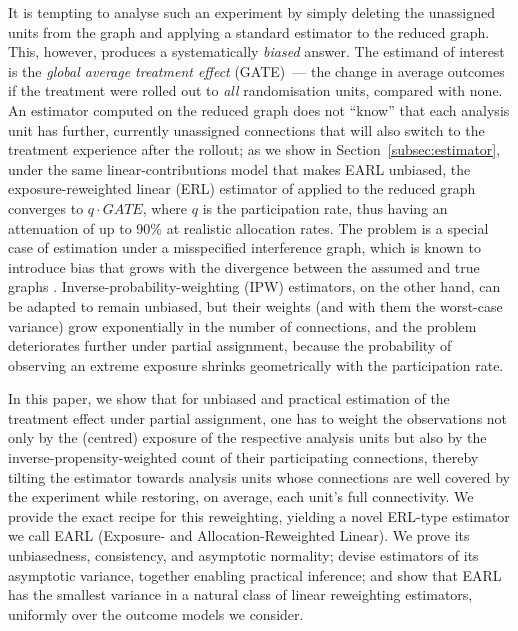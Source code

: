 \documentclass[sigconf,anonymous,review]{acmart}
\begin{document}
It is tempting to analyse such an experiment by simply deleting the unassigned units from the graph and applying a standard estimator to the reduced graph. This, however, produces a systematically \emph{biased} answer. The estimand of interest is the \emph{global average treatment effect} (GATE)~--- the change in average outcomes if the treatment were rolled out to \emph{all} randomisation units, compared with none. An estimator computed on the reduced graph does not ``know'' that each analysis unit has further, currently unassigned connections that will also switch to the treatment experience after the rollout; as we show in Section~\ref{subsec:estimator}, under the same linear-contributions model that makes EARL unbiased, the exposure-reweighted linear (ERL) estimator of \citet{harshaw2023erl} applied to the reduced graph converges to $q\cdot GATE$, where $q$ is the participation rate, thus having an attenuation of up to 90\% at realistic allocation rates. The problem is a special case of estimation under a misspecified interference graph, which is known to introduce bias that grows with the divergence between the assumed and true graphs \cite{weinstein2026causal,savje2024misspecified}. Inverse-probability-weighting (IPW) estimators, on the other hand, can be adapted to remain unbiased, but their weights (and with them the worst-case variance) grow exponentially in the number of connections, and the problem deteriorates further under partial assignment, because the probability of observing an extreme exposure shrinks geometrically with the participation rate.

In this paper, we show that for unbiased and practical estimation of the treatment effect under partial assignment, one has to weight the observations not only by the (centred) exposure of the respective analysis units but also by the inverse-propensity-weighted count of their participating connections, thereby tilting the estimator towards analysis units whose connections are well covered by the experiment while restoring, on average, each unit's full connectivity. We provide the exact recipe for this reweighting, yielding a novel ERL-type estimator we call EARL (Exposure- and Allocation-Reweighted Linear). We prove its unbiasedness, consistency, and asymptotic normality; devise estimators of its asymptotic variance, together enabling practical inference; and show that EARL has the smallest variance in a natural class of linear reweighting estimators, uniformly over the outcome models we consider.
\end{document}
